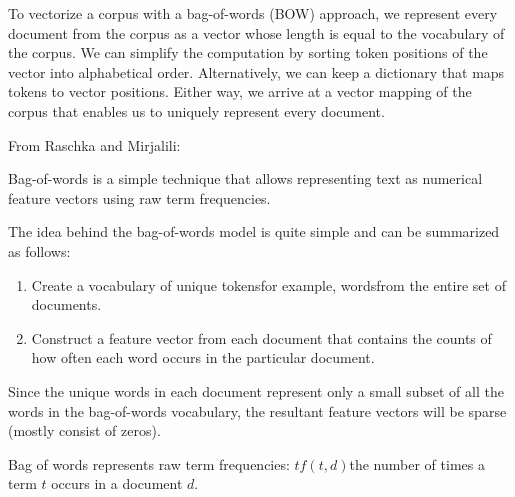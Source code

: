 \documentclass[11pt]{article}
\begin{document}
    To vectorize a corpus with a bag-of-words (BOW) approach, we represent every document from the corpus as a vector whose length is equal to the vocabulary of the corpus.
    We can simplify the computation by sorting token positions of the vector into alphabetical order.
    Alternatively, we can keep a dictionary that maps tokens to vector positions.
    Either way, we arrive at a vector mapping of the corpus that enables us to uniquely represent every document.

    \vspace{5mm}

    From Raschka and Mirjalili\cite{RaschkaMirjalili2017}:

    Bag-of-words is a simple technique that allows representing text as numerical feature vectors using raw term frequencies.

    The idea behind the bag-of-words model is quite simple and can be summarized as follows:

    \begin{enumerate}
        \item Create a vocabulary of unique tokens\textemdash for example, words\textemdash from the entire set of documents.
        \item Construct a feature vector from each document that contains the counts of how often each word occurs in the particular document.
    \end{enumerate}

    Since the unique words in each document represent only a small subset of all the words in the bag-of-words vocabulary, the resultant feature vectors will be sparse (mostly consist of zeros).

    Bag of words represents raw term frequencies: $tf(t, d)$\textemdash the number of times a term $t$ occurs in a document $d$.


    
    
\end{document}
